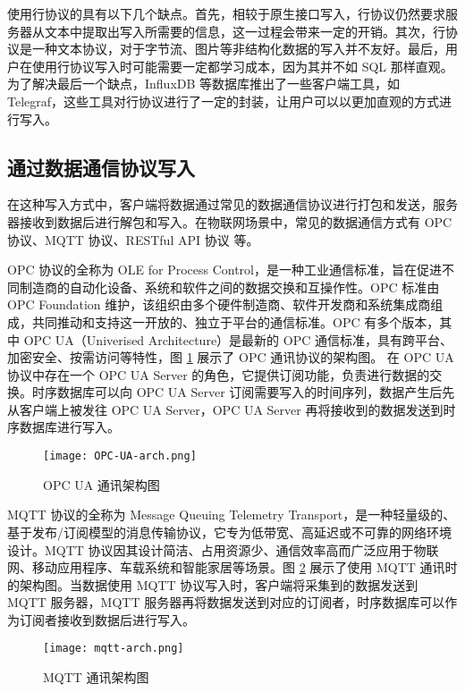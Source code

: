 使用行协议的具有以下几个缺点。首先，相较于原生接口写入，行协议仍然要求服务器从文本中提取出写入所需要的信息，这一过程会带来一定的开销。其次，行协议是一种文本协议，对于字节流、图片等非结构化数据的写入并不友好。最后，用户在使用行协议写入时可能需要一定都学习成本，因为其并不如 SQL 那样直观。为了解决最后一个缺点，InfluxDB 等数据库推出了一些客户端工具，如 Telegraf\cite{influx2024telegraf}，这些工具对行协议进行了一定的封装，让用户可以以更加直观的方式进行写入。

\subsection{通过数据通信协议写入}
在这种写入方式中，客户端将数据通过常见的数据通信协议进行打包和发送，服务器接收到数据后进行解包和写入。在物联网场景中，常见的数据通信方式有 OPC 协议\cite{zheng2002opc}、MQTT 协议\cite{soni2017survey}、RESTful API 协议\cite{fielding2000architectural} 等。

OPC 协议的全称为 OLE for Process Control，是一种工业通信标准，旨在促进不同制造商的自动化设备、系统和软件之间的数据交换和互操作性。OPC 标准由 OPC Foundation 维护，该组织由多个硬件制造商、软件开发商和系统集成商组成，共同推动和支持这一开放的、独立于平台的通信标准。OPC 有多个版本，其中 OPC UA（Univerised Architecture）是最新的 OPC 通信标准，具有跨平台、加密安全、按需访问等特性\cite{hannelius2008roadmap}，图 \ref{fig:opc-arch} 展示了 OPC 通讯协议的架构图。 在 OPC UA 协议中存在一个 OPC UA Server 的角色，它提供订阅功能，负责进行数据的交换。时序数据库可以向 OPC UA Server 订阅需要写入的时间序列，数据产生后先从客户端上被发往 OPC UA Server，OPC UA Server 再将接收到的数据发送到时序数据库进行写入。
\begin{figure}
  \centering
  \texttt{[image: OPC-UA-arch.png]}
  \caption{OPC UA 通讯架构图\cite{leitner2006opc}}
  \label{fig:opc-arch}
\end{figure}


MQTT 协议的全称为 Message Queuing Telemetry Transport，是一种轻量级的、基于发布/订阅模型的消息传输协议，它专为低带宽、高延迟或不可靠的网络环境设计。MQTT 协议因其设计简洁、占用资源少、通信效率高而广泛应用于物联网、移动应用程序、车载系统和智能家居等场景\cite{yassein2017internet}。图 \ref{fig:mqtt-arch} 展示了使用 MQTT 通讯时的架构图。当数据使用 MQTT 协议写入时，客户端将采集到的数据发送到 MQTT 服务器，MQTT 服务器再将数据发送到对应的订阅者，时序数据库可以作为订阅者接收到数据后进行写入。
\begin{figure}
  \centering
  \texttt{[image: mqtt-arch.png]}
  \caption{MQTT 通讯架构图\cite{soni2017survey}}
  \label{fig:mqtt-arch}
\end{figure}

